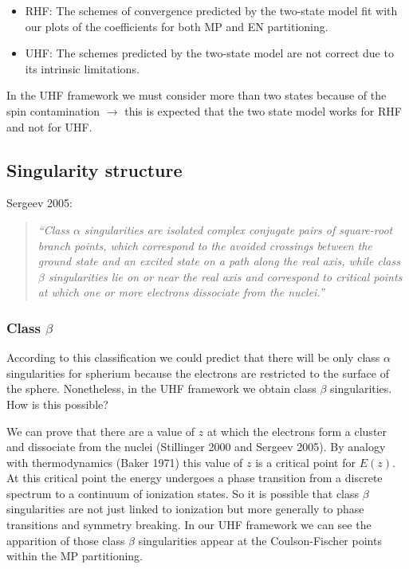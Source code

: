 \documentclass{article}
\begin{document}
\begin{itemize}
	\item RHF: The schemes of convergence predicted by the two-state model fit with our plots of the coefficients for both MP and EN partitioning.
	\item UHF: The schemes predicted by the two-state model are not correct due to its intrinsic limitations. 
\end{itemize}
In the UHF framework we must consider more than two states because of the spin contamination $\rightarrow$ this is expected that the two state model works for RHF and not for UHF.

\subsection{Singularity structure}

Sergeev 2005:
\begin{quote}
\textit{``Class $\alpha$ singularities are isolated complex conjugate pairs of square-root branch points, which correspond to the avoided crossings between the ground state and an excited state on a path along the real axis, while class $\beta$ singularities lie on or near the real axis and correspond to critical points at which one or more electrons dissociate from the nuclei.''}
\end{quote}

\subsubsection{Class $\beta$}

According to this classification we could predict that there will be only class $\alpha$ singularities for spherium because the electrons are restricted to the surface of the sphere.
Nonetheless, in the UHF framework we obtain class $\beta$ singularities. 
How is this possible?

We can prove that there are a value of $z$ at which the electrons form a cluster and dissociate from the nuclei (Stillinger 2000 and Sergeev 2005). 
By analogy with thermodynamics (Baker 1971) this value of $z$ is a critical point for $E(z)$. 
At this critical point the energy undergoes a phase transition from a discrete spectrum to a continuum of ionization states. 
So it is possible that class $\beta$ singularities are not just linked to ionization but more generally to phase transitions and symmetry breaking.
In our UHF framework we can see the apparition of those class $\beta$ singularities appear at the Coulson-Fischer points within the MP partitioning.
\end{document}
